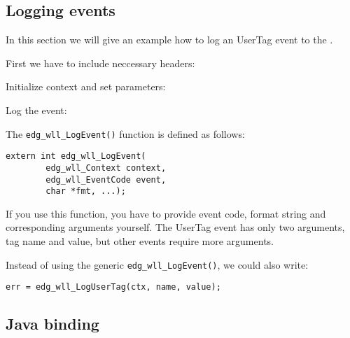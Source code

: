 \subsection{Logging events}
In this section we will give an example how to log an UserTag event to
the \LB.

First we have to include neccessary headers:


Initialize context and set parameters:




Log the event:


The \verb'edg_wll_LogEvent()' function is defined as follows:
\begin{lstlisting}[numbers=none]
extern int edg_wll_LogEvent(
        edg_wll_Context context,
        edg_wll_EventCode event,
        char *fmt, ...);
\end{lstlisting}
If you use this function, you have to provide event code, format
string and corresponding arguments yourself. The UserTag event has
only two arguments, tag name and value, but other events require more
arguments. 

Instead of using the generic \verb'edg_wll_LogEvent()', we could also
write:
\begin{lstlisting}[firstnumber=92]
err = edg_wll_LogUserTag(ctx, name, value);
\end{lstlisting}

\subsection{Java binding}

